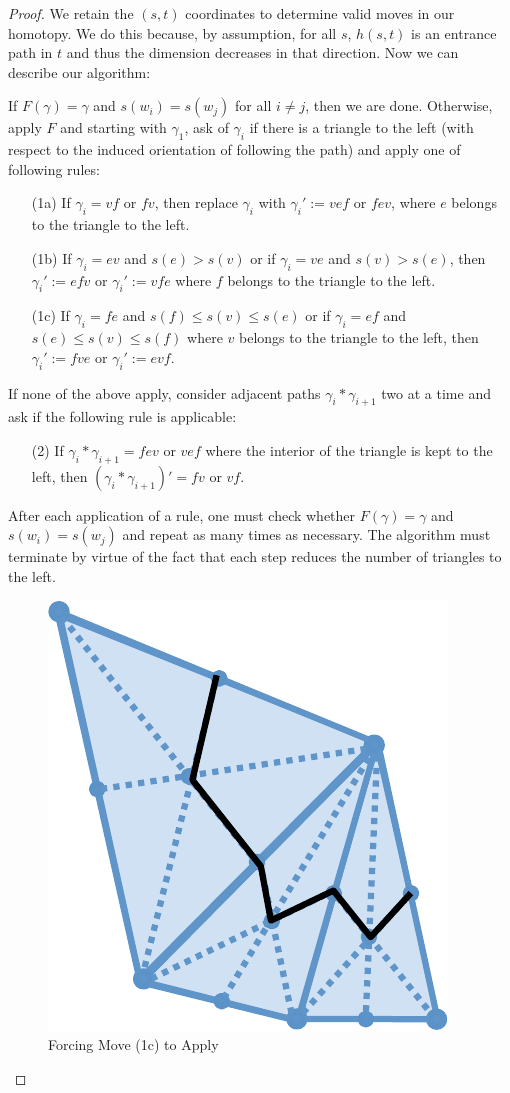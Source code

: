 \begin{proof}
	We retain the $(s,t)$ coordinates to determine valid moves in our homotopy. We do this because, by assumption, for all $s$, $h(s,t)$ is an entrance path in $t$ and thus the dimension decreases in that direction. Now we can describe our algorithm:
	
	If $F(\gamma)=\gamma$ and $s(w_i)=s(w_j)$ for all $i\neq j$, then we are done. Otherwise, apply $F$ and starting with $\gamma_1$, ask of $\gamma_i$ if there is a triangle to the left (with respect to the induced orientation of following the path) and apply one of following rules:
	\begin{enumerate}
		\item[(1a)] If $\gamma_i=vf$ or $fv$, then replace $\gamma_i$ with $\gamma_i':=vef$ or $fev$, where $e$ belongs to the triangle to the left.
		\item[(1b)] If $\gamma_i=ev$ and $s(e)>s(v)$ or if $\gamma_i=ve$ and $s(v)>s(e)$, then $\gamma_i':=efv$ or $\gamma_i':=vfe$ where $f$ belongs to the triangle to the left.
		\item[(1c)] If $\gamma_i=fe$ and $s(f)\leq s(v)\leq s(e)$ or if $\gamma_i=ef$ and $s(e)\leq s(v) \leq s(f)$ where $v$ belongs to the triangle to the left, then $\gamma_i':=fve$ or $\gamma_i':=evf$.
	\end{enumerate}
	If none of the above apply, consider adjacent paths $\gamma_i\ast\gamma_{i+1}$ two at a time and ask if the following rule is applicable:
	\begin{enumerate}
		\item[(2)] If $\gamma_i\ast \gamma_{i+1}=fev$ or $vef$ where the interior of the triangle is kept to the left, then $(\gamma_i\ast\gamma_{i+1})'=fv$ or $vf$.
	\end{enumerate}
	After each application of a rule, one must check whether $F(\gamma)=\gamma$ and $s(w_i)=s(w_j)$ and repeat as many times as necessary. The algorithm must terminate by virtue of the fact that each step reduces the number of triangles to the left.
	
	\begin{figure}
		\centering
		\includegraphics[width=.5\textwidth]{vkt_1c.pdf}
		\caption{Forcing Move (1c) to Apply}
		\label{fig:vkt_1c}
	\end{figure}
	

\end{proof}
